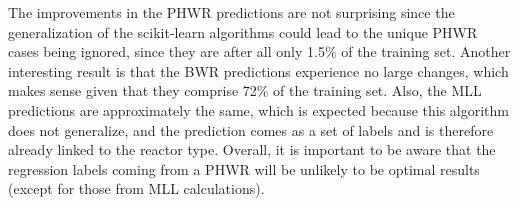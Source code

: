 The improvements in the \gls{PHWR} predictions are not surprising since the
generalization of the scikit-learn algorithms could lead to the unique
\gls{PHWR} cases being ignored, since they are after all only 1.5\% of the
training set.  Another interesting result is that the \gls{BWR} predictions
experience no large changes, which makes sense given that they comprise 72\% of
the training set. Also, the \gls{MLL} predictions are approximately the same,
which is expected because this algorithm does not generalize, and the
prediction comes as a set of labels and is therefore already linked to the
reactor type. Overall, it is important to be aware that the regression labels
coming from a \gls{PHWR} will be unlikely to be optimal results (except for
those from \gls{MLL} calculations).

